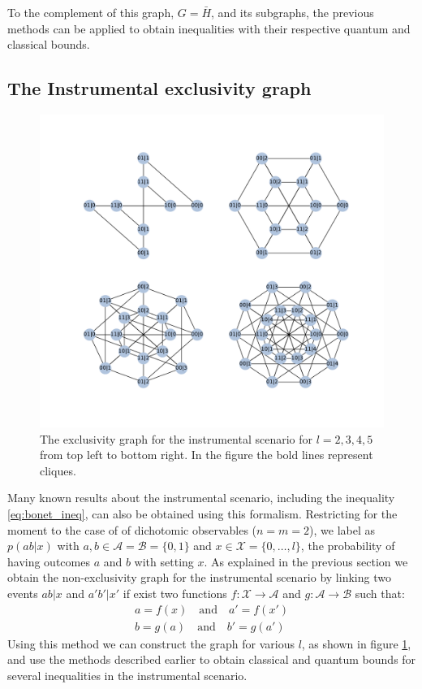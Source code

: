 \documentclass[
    nofootinbin,
    floatfix,
    amsfonts,
    twocolumn, 
    aps, 
    prl]{revtex4-1}
\begin{document}
To the complement of this graph, $G=\bar{H}$, and its subgraphs, the previous
methods can be applied to obtain inequalities with their respective quantum and
classical bounds.

\subsection{The Instrumental exclusivity graph}
\begin{figure}[t]
    \centering
    \includegraphics[width=.7\textwidth]{images/instrumental_exgraph.pdf}
    \caption{The exclusivity graph for the instrumental scenario for $l=2,3,4,5$
    from top left to bottom right. In the figure the bold lines represent
    cliques.}
    \label{fig:instrumental_exgraphs}
\end{figure}

Many known results about the instrumental scenario, including the inequality
\eqref{eq:bonet_ineq}, can also be obtained using this formalism.  Restricting
for the moment to the case of of dichotomic observables ($n = m = 2$), we label
as $p(ab|x)$ with $a, b \in \mathcal{A} = \mathcal{B} = \{0,1\}$ and $x \in
\mathcal{X} = \{0,\ldots,l\}$, the probability of having outcomes $a$ and $b$
with setting $x$. 
As explained in the previous section we obtain the non-exclusivity graph for the
instrumental scenario by linking two events $ab|x$ and $a'b'|x'$ if exist two
functions $f:\mathcal{X} \rightarrow \mathcal{A}$ and $g:\mathcal{A} \rightarrow
\mathcal{B}$ such that:
\begin{align}
    a = f(x) \quad\text{and}\quad a'=f(x')\\
    b = g(a) \quad\text{and}\quad b'=g(a')
    \label{eq:non_exclusivity_condition}
\end{align}
Using this method we can construct the graph for various $l$, as shown in figure
\ref{fig:instrumental_exgraphs}, and use the methods described earlier to obtain
classical and quantum bounds for several inequalities in the instrumental
scenario. 
\end{document}
